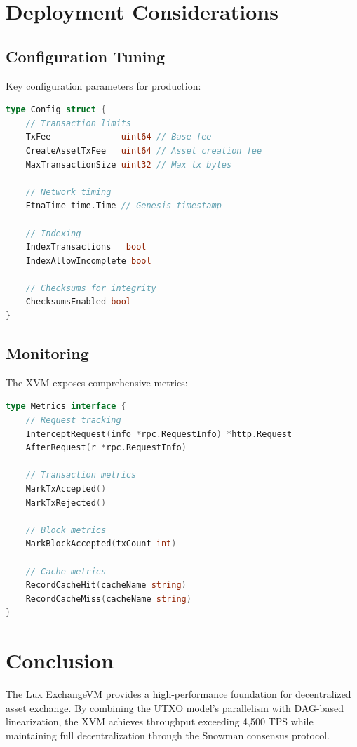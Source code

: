 \documentclass[11pt,a4paper]{article}
\begin{document}
\section{Deployment Considerations}

\subsection{Configuration Tuning}

Key configuration parameters for production:

\begin{lstlisting}[language=Go,caption={Production Configuration}]
type Config struct {
    // Transaction limits
    TxFee              uint64 // Base fee
    CreateAssetTxFee   uint64 // Asset creation fee
    MaxTransactionSize uint32 // Max tx bytes

    // Network timing
    EtnaTime time.Time // Genesis timestamp

    // Indexing
    IndexTransactions   bool
    IndexAllowIncomplete bool

    // Checksums for integrity
    ChecksumsEnabled bool
}
\end{lstlisting}

\subsection{Monitoring}

The XVM exposes comprehensive metrics:

\begin{lstlisting}[language=Go,caption={Metrics Interface}]
type Metrics interface {
    // Request tracking
    InterceptRequest(info *rpc.RequestInfo) *http.Request
    AfterRequest(r *rpc.RequestInfo)

    // Transaction metrics
    MarkTxAccepted()
    MarkTxRejected()

    // Block metrics
    MarkBlockAccepted(txCount int)

    // Cache metrics
    RecordCacheHit(cacheName string)
    RecordCacheMiss(cacheName string)
}
\end{lstlisting}

\section{Conclusion}

The Lux ExchangeVM provides a high-performance foundation for decentralized asset exchange. By combining the UTXO model's parallelism with DAG-based linearization, the XVM achieves throughput exceeding 4,500 TPS while maintaining full decentralization through the Snowman consensus protocol.
\end{document}
